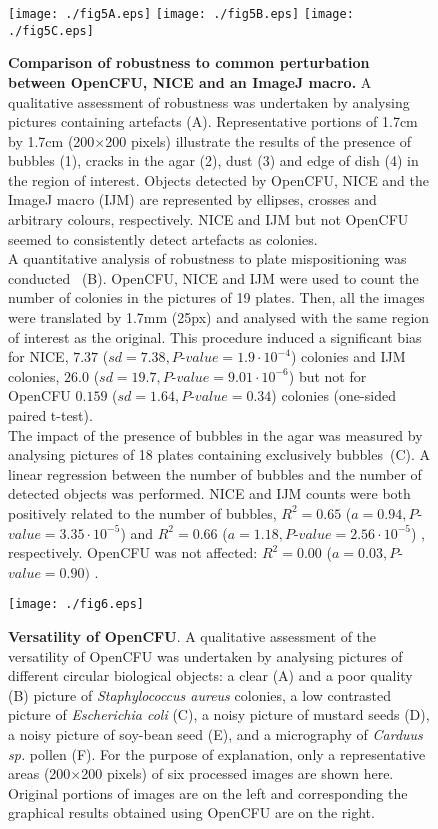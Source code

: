 \documentclass[10pt]{article}
\newcommand{\sa}{\emph{Staphylococcus aureus}}
\newcommand{\IJM}{IJM}
\newcommand{\EdgeNoiseOCFU}{$0.159$ ($sd=1.64, P$-$value=0.34$)}
\newcommand{\EdgeNoiseIJM}{$26.0$ ($sd=19.7, P$-$value=9.01\cdot 10^{-6}$)}
\newcommand{\EdgeNoiseNICE}{$7.37$ ($sd=7.38,P$-$value=1.9\cdot 10^{-4}$)}
\newcommand{\BubbleNoiseOCFU}{$R^2 = 0.00$ ($a=0.03, P$-$value=0.90)$ }
\newcommand{\BubbleNoiseNICE}{$R^2 = 0.65$ ($a=0.94, P$-$value=3.35\cdot 10^{-5}$) }
\newcommand{\BubbleNoiseIJM}{$R^2 = 0.66$ ($a=1.18, P$-$value=2.56\cdot 10^{-5}$) }
\begin{document}
\begin{figure}[!ht]
\begin{center}
\texttt{[image: ./fig5A.eps]}
\texttt{[image: ./fig5B.eps]}
\texttt{[image: ./fig5C.eps]}
\end{center}

\caption{{\bf Comparison of robustness to common perturbation between OpenCFU, 
NICE\cite{clarke_lowcost_2010} and an ImageJ macro\cite{cai_optimized_2011}.} 
A qualitative assessment of robustness was undertaken by analysing pictures
containing artefacts (A).
Representative portions of 1.7cm by 1.7cm (200$\times{}$200 pixels) illustrate
the results of the presence of bubbles (1), cracks in the agar (2), dust (3) and
edge of dish (4) in the region of interest. Objects detected by OpenCFU, NICE
and the ImageJ macro (\IJM) are represented by ellipses, crosses and arbitrary
colours, respectively.
NICE and \IJM{} but not OpenCFU seemed to consistently detect artefacts as
colonies.\\
A quantitative analysis of robustness to plate mispositioning was
conducted ~(B).
OpenCFU, NICE and \IJM{} were used to count the number of colonies in the
pictures of 19 plates. Then, all the images were translated by 1.7mm (25px) and
analysed with the same region of interest as the original.
This procedure induced a significant bias for NICE, \EdgeNoiseNICE{} colonies and \IJM{} colonies,
\EdgeNoiseIJM{} but not for OpenCFU \EdgeNoiseOCFU{} colonies (one-sided paired
t-test).\\
The impact of the presence of bubbles in the agar was measured by analysing
pictures of 18 plates containing exclusively bubbles~(C).
A linear regression between the number of bubbles and the number of detected
objects was performed.
NICE and \IJM{} counts were both positively related to the number of bubbles,
\BubbleNoiseNICE{} and \BubbleNoiseIJM{}, respectively. OpenCFU was not affected:
\BubbleNoiseOCFU{}.
}
\label{figRobust}
\end{figure}

\newpage{}


\begin{figure}[!ht]

\begin{center}
\texttt{[image: ./fig6.eps]}
\end{center}

\caption{{\bf Versatility of OpenCFU}.
A qualitative assessment of the versatility of OpenCFU was undertaken by 
analysing pictures of different circular biological objects:
a clear (A) and a poor quality (B) picture of \sa{} colonies,
a low contrasted picture of \emph{Escherichia coli} (C),
a noisy picture of mustard seeds (D),
a noisy picture of soy-bean seed (E),
and a micrography of \emph{Carduus sp.} pollen (F).
For the purpose of explanation, only a representative areas (200$\times{}$200 pixels)
of six processed images are shown here.
Original portions of images are on the left and corresponding 
the graphical results obtained using OpenCFU are on the right.
}
\label{figVersat}
\end{figure}
\end{document}
